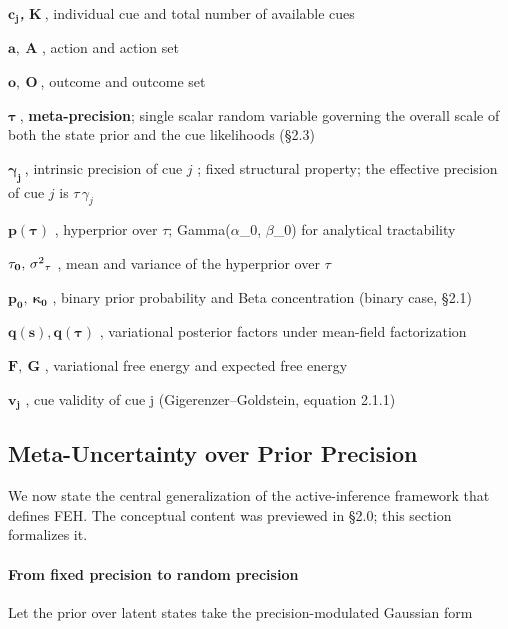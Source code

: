 \documentclass{article}
\begin{document}
\(\mathbf{c}_{\mathbf{j}}\)\textbf{\emph{,}} \(\mathbf{K}\ \),
individual cue and total number of available cues

\(\mathbf{a,\ A}\) , action and action set

\(\mathbf{o,\ O}\ \), outcome and outcome set

\(\mathbf{\tau}\ \), \textbf{meta-precision}; single scalar random
variable governing the overall scale of both the state prior and the cue
likelihoods (\S{}2.3)

\(\mathbf{\gamma}_{\mathbf{j}}\ \), intrinsic precision of cue \(j\) ;
fixed structural property; the effective precision of cue \(j\) is
\(\tau\,\gamma_{j}\)

\(\mathbf{p}\left( \mathbf{\tau} \right)\) , hyperprior over \ensuremath{\tau};
Gamma(\ensuremath{\alpha}\_0, \ensuremath{\beta}\_0) for analytical tractability

\(\mathbf{\tau}_{\mathbf{0}}\mathbf{,\ }\mathbf{\sigma \textsuperscript{2}}_{\mathbf{\tau}}\)
, mean and variance of the hyperprior over \(\tau\)

\(\mathbf{p}_{\mathbf{0}}\mathbf{,\ }\mathbf{\kappa}_{\mathbf{0}}\) ,
binary prior probability and Beta concentration (binary case, \S{}2.1)

\(\mathbf{q}\left( \mathbf{s} \right)\mathbf{,q}\left( \mathbf{\tau} \right)\)
, variational posterior factors under mean-field factorization

\(\mathbf{F,\ G}\) , variational free energy and expected free energy

\(\mathbf{v}_{\mathbf{j}}\) , cue validity of cue j
(Gigerenzer--Goldstein, equation 2.1.1)

\subsection{Meta-Uncertainty over Prior
Precision}\label{meta-uncertainty-over-prior-precision}

We now state the central generalization of the active-inference
framework that defines FEH. The conceptual content was previewed in
\S{}2.0; this section formalizes it.

\paragraph{From fixed precision to random
precision}\label{from-fixed-precision-to-random-precision}

Let the prior over latent states take the precision-modulated Gaussian
form
\end{document}
